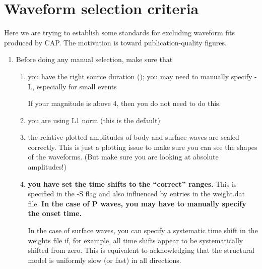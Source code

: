 \section{Waveform selection criteria}

Here we are trying to establish some standards for excluding waveform fits produced by CAP. The motivation is toward publication-quality figures.

\begin{enumerate}

\item Before doing any manual selection, make sure that
\begin{enumerate}
\item you have the right source duration (); you may need to manually specify -L, especially for small events

If your magnitude is above 4, then you do not need to do this.

\item you are using L1 norm (this is the default)

\item the relative plotted amplitudes of body and surface waves are scaled correctly. This is just a plotting issue to make sure you can see the shapes of the waveforms. (But make sure you are looking at absolute amplitudes!)

\item {\bf you have set the time shifts to the ``correct'' ranges}. This is specified in the -S flag and also influenced by entries in the weight.dat file. {\bf In the case of P waves, you may have to manually specify the onset time.}

In the case of surface waves, you can specify a systematic time shift in the weights file if, for example, all time shifts appear to be systematically shifted from zero. This is equivalent to acknowledging that the structural model is uniformly slow (or fast) in all directions.


\end{enumerate}
\end{enumerate}
